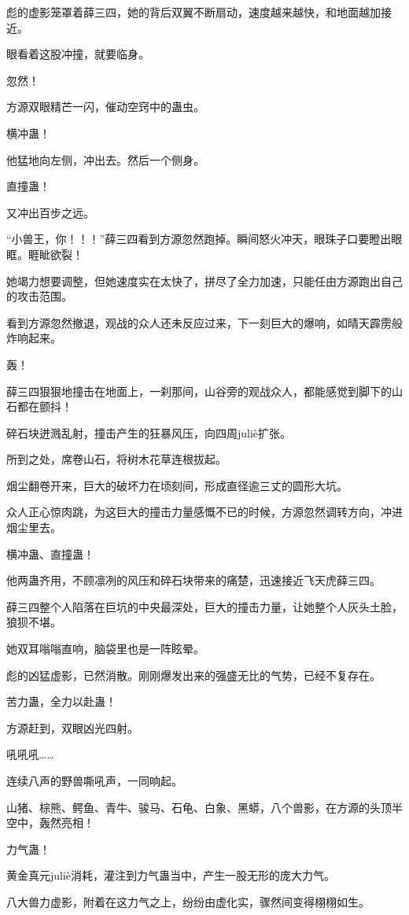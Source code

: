 \begin{this_body}
彪的虚影笼罩着薛三四，她的背后双翼不断扇动，速度越来越快，和地面越加接近。

眼看着这股冲撞，就要临身。

忽然！

方源双眼精芒一闪，催动空窍中的蛊虫。

横冲蛊！

他猛地向左侧，冲出去。然后一个侧身。

直撞蛊！

又冲出百步之远。

“小兽王，你！！！”薛三四看到方源忽然跑掉。瞬间怒火冲天，眼珠子口要瞪出眼眶。睚眦欲裂！

她竭力想要调整，但她速度实在太快了，拼尽了全力加速，只能任由方源跑出自己的攻击范围。

看到方源忽然撤退，观战的众人还未反应过来，下一刻巨大的爆响，如晴天霹雳般炸响起来。

轰！

薛三四狠狠地撞击在地面上，一刹那间，山谷旁的观战众人，都能感觉到脚下的山石都在颤抖！

碎石块迸溅乱射，撞击产生的狂暴风压，向四周juliè扩张。

所到之处，席卷山石，将树木花草连根拔起。

烟尘翻卷开来，巨大的破坏力在顷刻间，形成直径逾三丈的圆形大坑。

众人正心惊肉跳，为这巨大的撞击力量感慨不已的时候，方源忽然调转方向，冲进烟尘里去。

横冲蛊、直撞蛊！

他两蛊齐用，不顾凛冽的风压和碎石块带来的痛楚，迅速接近飞天虎薛三四。

薛三四整个人陷落在巨坑的中央最深处，巨大的撞击力量，让她整个人灰头土脸，狼狈不堪。

她双耳嗡嗡直响，脑袋里也是一阵眩晕。

彪的凶猛虚影，已然消散。刚刚爆发出来的强盛无比的气势，已经不复存在。

苦力蛊，全力以赴蛊！

方源赶到，双眼凶光四射。

吼吼吼……

连续八声的野兽嘶吼声，一同响起。

山猪、棕熊、鳄鱼、青牛、骏马、石龟、白象、黑蟒，八个兽影，在方源的头顶半空中，轰然亮相！

力气蛊！

黄金真元juliè消耗，灌注到力气蛊当中，产生一股无形的庞大力气。

八大兽力虚影，附着在这力气之上，纷纷由虚化实，骤然间变得栩栩如生。


\end{this_body}
